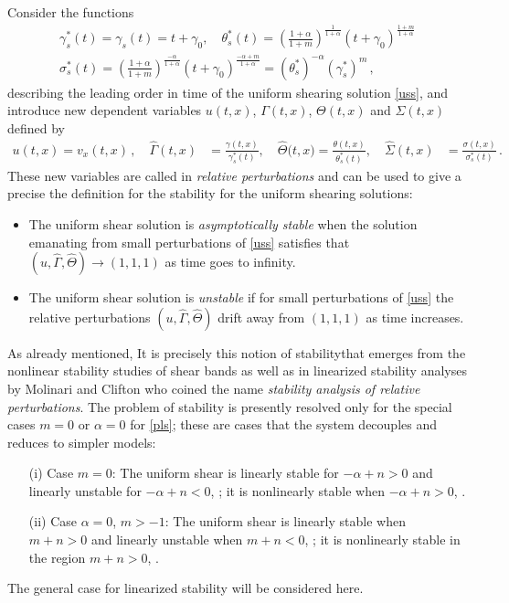 \documentclass[a4paper,11pt]{article}
\theoremstyle{remark}
\begin{document}
Consider the  functions
\begin{equation}
\label{timescale}
\begin{aligned}
\gamma^*_s (t)  = \gamma_s (t)  = t + \gamma_0 , \quad 
\theta^*_s (t)  =\left( \frac{1+\alpha}{1+m}\right)^{\frac{1}{1+\alpha}} (t + \gamma_0)^{\frac{1+m}{1+\alpha}}
\\
\sigma^*_s (t) = \left( \frac{1+\alpha}{1+m}\right)^{\frac{-\alpha}{1+\alpha}} (t + \gamma_0)^{\frac{-\alpha+m}{1+\alpha}} 
= (\theta^*_s)^{-\alpha} (\gamma^*_s)^m \, ,
\end{aligned}
\end{equation}
describing the leading order in time of the uniform shearing solution \eqref{uss}, and introduce new dependent variables $u(t,x)$,
 $\Gamma (t, x)$, $\Theta (t,x)$ and $\Sigma(t,x)$ defined by 
\begin{equation}
\label{rescale}
 \begin{aligned}
 u(t,x) = v_x (t,x) \, , \quad
  \hat \Gamma (t,x) &= \frac{\gamma(t,x)}{\gamma^*_s(t)}, \quad \hat\Theta\big(t,x\big)=\frac{\theta(t,x)}{\theta^*_s (t)}, \quad 
  \hat\Sigma(t,x) &= \frac{\sigma(t,x)}{\sigma^*_s(t)} \, . \
   \end{aligned}
\end{equation}
These new variables are called in \cite{HN77,MC87,FM87}  {\it relative perturbations} and can be used to give a 
precise the definition for the stability for the uniform shearing solutions:
\begin{itemize}
\item
The uniform shear solution is {\it asymptotically stable} when the solution emanating from small perturbations
of \eqref{uss} satisfies that $(u, \hat\Gamma, \hat\Theta) \to (1,1,1)$ as time goes to infinity.
\item
The uniform shear solution is {\it unstable} if for small perturbations of \eqref{uss} the relative perturbations 
$(u, \hat\Gamma, \hat\Theta)$ drift away from $(1,1,1)$ as time increases.
\end{itemize}

As already mentioned, It is precisely this notion of stabilitythat emerges from the nonlinear stability studies of shear bands \cite{DH83,Tzavaras86a} as well as
in linearized stability analyses by  Molinari and Clifton \cite{MC87,FM87} 
who coined the name {\it stability analysis of relative perturbations}. The problem of stability is presently resolved only for the special cases 
$m=0$ or $\alpha = 0$ for \eqref{pls};  these are cases that the system decouples and reduces to simpler models:
\begin{itemize}
\item[(i)] Case $m=0$: The uniform shear is linearly stable for $-\alpha + n > 0$ and linearly unstable for $-\alpha + n < 0$, \cite{MC87,FM87};
it is nonlinearly stable when $-\alpha + n > 0$, \cite{Tzavaras86a}.
\item[(ii)] Case $\alpha =0$, $m > -1$: The uniform shear is linearly stable when $m + n > 0$ and linearly unstable when $m+ n < 0$, \cite{FM87,Tzavaras92};
it is nonlinearly stable in the region $m + n > 0$, \cite{Tzavaras91}.
\end{itemize}
The general case for linearized stability will be considered here.
\end{document}
